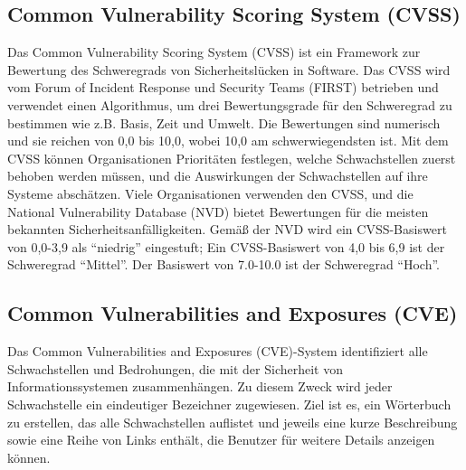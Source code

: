 \subsection{Common Vulnerability Scoring System (CVSS)}

Das Common Vulnerability Scoring System (CVSS) ist ein Framework zur Bewertung des Schweregrads von Sicherheitslücken in Software. Das CVSS wird vom Forum of Incident Response und Security Teams (FIRST) betrieben und verwendet einen Algorithmus, um drei Bewertungsgrade für den Schweregrad zu bestimmen wie z.B. Basis, Zeit und Umwelt. Die Bewertungen sind numerisch und sie reichen von 0,0 bis 10,0, wobei 10,0 am schwerwiegendsten ist. Mit dem CVSS können Organisationen Prioritäten festlegen, welche Schwachstellen zuerst behoben werden müssen, und die Auswirkungen der Schwachstellen auf ihre Systeme abschätzen. Viele Organisationen verwenden den CVSS, und die National Vulnerability Database (NVD) bietet Bewertungen für die meisten bekannten Sicherheitsanfälligkeiten. Gemäß der NVD wird ein CVSS-Basiswert von 0,0-3,9 als "`niedrig"' eingestuft; Ein CVSS-Basiswert von 4,0 bis 6,9 ist der Schweregrad "`Mittel"'. Der Basiswert von 7.0-10.0 ist der Schweregrad "`Hoch"'\cite{cvss16}.\\

\subsection{Common Vulnerabilities and Exposures (CVE)}

Das Common Vulnerabilities and Exposures (CVE)-System identifiziert alle Schwachstellen und Bedrohungen, die mit der Sicherheit von Informationssystemen zusammenhängen. Zu diesem Zweck wird jeder Schwachstelle ein eindeutiger Bezeichner zugewiesen. Ziel ist es, ein Wörterbuch zu erstellen, das alle Schwachstellen auflistet und jeweils eine kurze Beschreibung sowie eine Reihe von Links enthält, die Benutzer für weitere Details anzeigen können\cite{cve18}.\\
















